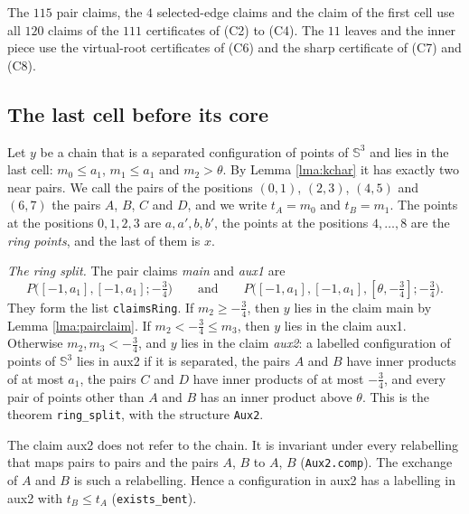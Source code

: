 \documentclass[reqno,a4paper,11pt]{amsart}
\numberwithin{equation}{section}
\newcommand{\Sph}{\mathbb{S}}
\newcommand{\lean}[1]{\texttt{#1}}
\begin{document}
The $115$ pair claims, the $4$ selected-edge claims and the claim of the first cell use all $120$ claims of the $111$ certificates of (C2) to (C4). The $11$ leaves and the inner piece use the virtual-root certificates of (C6) and the sharp certificate of (C7) and (C8).

\subsection{The last cell before its core}\label{sec:outer}

Let $y$ be a chain that is a separated configuration of points of $\Sph^3$ and lies in the last cell: $m_0 \leq a_1$, $m_1 \leq a_1$ and $m_2 > \theta$. By Lemma \ref{lma:kchar} it has exactly two near pairs. We call the pairs of the positions $(0,1)$, $(2,3)$, $(4,5)$ and $(6,7)$ the pairs $A$, $B$, $C$ and $D$, and we write $t_A = m_0$ and $t_B = m_1$. The points at the positions $0, 1, 2, 3$ are $a, a', b, b'$, the points at the positions $4, \dots, 8$ are the \emph{ring points}, and the last of them is $x$.

\emph{The ring split.} The pair claims \emph{main} and \emph{aux1} are
$$
P\big([-1,a_1],[-1,a_1]; -\tfrac34\big) \qquad \text{and} \qquad P\big([-1,a_1],[-1,a_1],[\theta,-\tfrac34]; -\tfrac34\big) .
$$
They form the list \lean{claimsRing}. If $m_2 \geq -\tfrac34$, then $y$ lies in the claim main by Lemma \ref{lma:pairclaim}. If $m_2 < -\tfrac34 \leq m_3$, then $y$ lies in the claim aux1. Otherwise $m_2, m_3 < -\tfrac34$, and $y$ lies in the claim \emph{aux2}: a labelled configuration of points of $\Sph^3$ lies in aux2 if it is separated, the pairs $A$ and $B$ have inner products of at most $a_1$, the pairs $C$ and $D$ have inner products of at most $-\tfrac34$, and every pair of points other than $A$ and $B$ has an inner product above $\theta$. This is the theorem \lean{ring\_split}, with the structure \lean{Aux2}.

The claim aux2 does not refer to the chain. It is invariant under every relabelling that maps pairs to pairs and the pairs $A$, $B$ to $A$, $B$ (\lean{Aux2.comp}). The exchange of $A$ and $B$ is such a relabelling. Hence a configuration in aux2 has a labelling in aux2 with $t_B \leq t_A$ (\lean{exists\_bent}).
\end{document}
